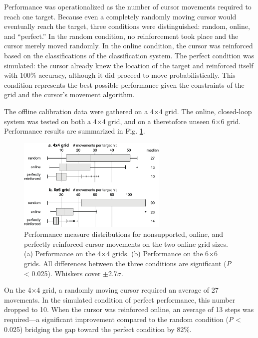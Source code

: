Performance was operationalized as the number of cursor movements required to reach one target. Because even a completely randomly moving cursor would eventually reach the target, three conditions were distinguished: random, online, and ``perfect.'' In the random condition, no reinforcement took place and the cursor merely moved randomly. In the online condition, the cursor was reinforced based on the classifications of the classification system. The perfect condition was simulated: the cursor already knew the location of the target and reinforced itself with 100\% accuracy, although it did proceed to move probabilistically. This condition represents the best possible performance given the constraints of the grid and the cursor's movement algorithm.

The offline calibration data were gathered on a 4$\times$4 grid. The online, closed-loop system was tested on both a 4$\times$4 grid, and on a theretofore unseen 6$\times$6 grid. Performance results are summarized in Fig. \ref{fig:nat:figure3}.

\begin{figure}[ht]
    \centering
    \includegraphics[width=0.64\textwidth]{figures/nat-figure3.pdf}
    \caption[Performance measure distributions for nonsupported, online, and perfectly reinforced cursor movements on the two online grid sizes.]{Performance measure distributions for nonsupported, online, and perfectly reinforced cursor movements on the two online grid sizes. (a) Performance on the 4$\times$4 grids. (b) Performance on the 6$\times$6 grids. All differences between the three conditions are significant (\textit{P} < 0.025). Whiskers cover $\pm$2.7$\sigma$.}
    \label{fig:nat:figure3}
\end{figure}

On the 4$\times$4 grid, a randomly moving cursor required an average of 27 movements. In the simulated condition of perfect performance, this number dropped to 10. When the cursor was reinforced online, an average of 13 steps was required---a significant improvement compared to the random condition (\textit{P} < 0.025) bridging the gap toward the perfect condition by 82\%.

